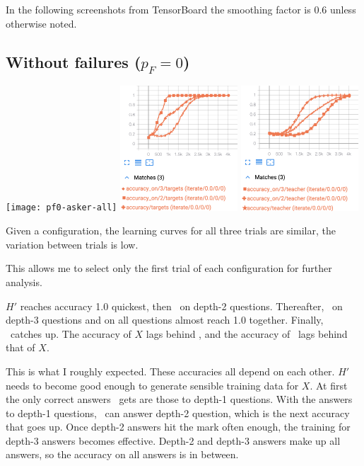 \documentclass{farlamp}
\begin{document}
In the following screenshots from TensorBoard the smoothing factor is 0.6 unless
otherwise noted.

\subsection{Without failures ($p_F = 0$)}

\texttt{[image: pf0-asker-all]}
\includegraphics[width=0.33\textwidth]{pf0-targets-all}
\includegraphics[width=0.33\textwidth]{pf0-teacher-all}

\Obs Given a configuration, the learning curves for all three trials are
similar, the variation between trials is low.

\Disc This allows me to select only the first trial of each configuration
for further analysis.

\Obs $H'$ reaches accuracy 1.0 quickest, then \AmpHp\ on depth-2
questions. Thereafter, \AmpHp\ on depth-3 questions and on all questions almost
reach 1.0 together. Finally, \Xpa\ catches up. The accuracy of $X$ lags behind
\AmpHp, and the accuracy of \Xpa\ lags behind that of $X$.

\Disc This is what I roughly expected. These accuracies all depend on each
other. $H'$ needs to become good enough to generate sensible training data for
$X$. At first the only correct answers \AmpHp\ gets are those to depth-1
questions. With the answers to depth-1 questions, \AmpHp\ can answer depth-2
question, which is the next accuracy that goes up. Once depth-2 answers hit the
mark often enough, the training for depth-3 answers becomes effective. Depth-2
and depth-3 answers make up all answers, so the accuracy on all answers is in
between.
\end{document}
